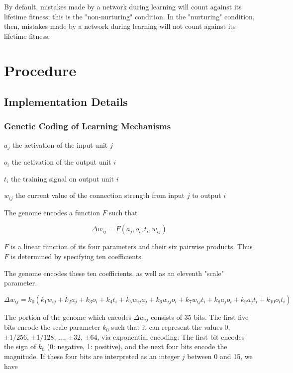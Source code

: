 \documentclass[master]{outhesis}
\begin{document}
By default, mistakes made by a network during learning will count against its lifetime fitness; this is the "non-nurturing" condition.
In the "nurturing" condition, then, mistakes made by a network during learning will not count against its lifetime fitness.

\chapter{Procedure}

\section{Implementation Details}

\subsection{Genetic Coding of Learning Mechanisms}

\begin{center}
	$a_j$ the activation of the input unit $j$
\end{center}

\begin{center}
	$o_i$ the activation of the output unit $i$
\end{center}

\begin{center}
	$t_i$ the training signal on output unit $i$
\end{center}

\begin{center}
	$w_{ij}$ the current value of the connection strength from input $j$ to output $i$
\end{center}

The genome encodes a function $F$ such that

\[
	\Delta w_{ij} = F(a_j, o_i, t_i, w_{ij})
\]

$F$ is a linear function of its four parameters and their six pairwise products. Thus $F$ is determined by specifying ten coefficients.

The genome encodes these ten coefficients, as well as an eleventh "scale" parameter.

\[
	\Delta w_{ij} = k_0(k_1w_{ij}+k_2a_j+k_3o_i+k_4t_i+k_5w_{ij}a_j+k_6w_{ij}o_i+k_7w_{ij}t_{i}+k_8a_jo_i+k_9a_jt_i+k_{10}o_it_i)
\]

The portion of the genome which encodes $\Delta w_{ij}$ consists of 35 bits. The first five bits encode the scale parameter $k_0$ such that it can represent the values $0$, $\pm 1/256$, $\pm 1/128$, ..., $\pm 32$, $\pm 64$, via exponential encoding. The first bit encodes the sign of $k_0$ (0: negative, 1: positive), and the next four bits encode the magnitude. If these four bits are interpreted as an integer $j$ between 0 and 15, we have
\end{document}
